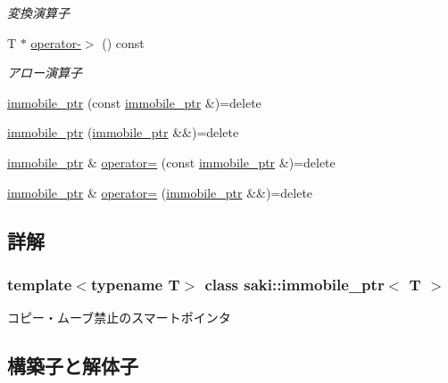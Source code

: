 \begin{DoxyCompactItemize}
\begin{DoxyCompactList}\small\item\em 変換演算子 \end{DoxyCompactList}\item 
T $\ast$ \mbox{\hyperlink{classsaki_1_1immobile__ptr_af834ac0a7db7da5e88a88584e7d1e453}{operator-\/$>$}} () const
\begin{DoxyCompactList}\small\item\em アロー演算子 \end{DoxyCompactList}\item 
\mbox{\hyperlink{classsaki_1_1immobile__ptr_ad0648153ed2d219d9cdf338a106de07c}{immobile\+\_\+ptr}} (const \mbox{\hyperlink{classsaki_1_1immobile__ptr}{immobile\+\_\+ptr}} \&)=delete
\item 
\mbox{\hyperlink{classsaki_1_1immobile__ptr_a06b9308842f0179d5705caadd90718b0}{immobile\+\_\+ptr}} (\mbox{\hyperlink{classsaki_1_1immobile__ptr}{immobile\+\_\+ptr}} \&\&)=delete
\item 
\mbox{\hyperlink{classsaki_1_1immobile__ptr}{immobile\+\_\+ptr}} \& \mbox{\hyperlink{classsaki_1_1immobile__ptr_aeda073b50b1e44b9aacf91ac6ba3891b}{operator=}} (const \mbox{\hyperlink{classsaki_1_1immobile__ptr}{immobile\+\_\+ptr}} \&)=delete
\item 
\mbox{\hyperlink{classsaki_1_1immobile__ptr}{immobile\+\_\+ptr}} \& \mbox{\hyperlink{classsaki_1_1immobile__ptr_a8b4e02a03c73cf8009248ebb0adfba7f}{operator=}} (\mbox{\hyperlink{classsaki_1_1immobile__ptr}{immobile\+\_\+ptr}} \&\&)=delete
\end{DoxyCompactItemize}


\subsection{詳解}
\subsubsection*{template$<$typename T$>$\newline
class saki\+::immobile\+\_\+ptr$<$ T $>$}

コピー・ムーブ禁止のスマートポインタ 

\subsection{構築子と解体子}
\mbox{\label{classsaki_1_1immobile__ptr_aa64c721ab505396e3b7b75bb6916b562}} 
